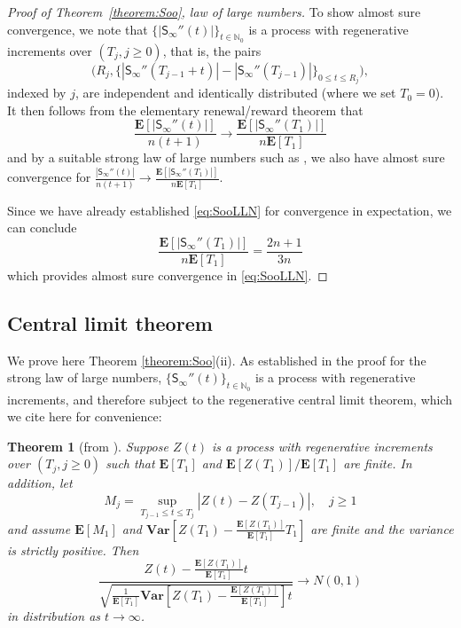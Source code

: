 \documentclass[a4paper,11pt,reqno]{amsart}
\newcommand{\paul}[1]{\todo[color=yellow!70,inline]{Paul: #1}}
\newcommand{\fabian}[1]{\todo[color=red!50,inline]{Fabian: #1}}
\newcommand{\IN}{\mathbb{N}}
\newcommand{\bE}{\mathbf{E}}
\newcommand{\bVar}{\mathbf{Var}}
\newcommand{\Soo}{\mathsf{S}_\infty}
\newtheorem{theorem}[lemma]{Theorem}
\theoremstyle{definition}
\begin{document}
\begin{proof}[Proof of Theorem~\ref{theorem:Soo}, law of large numbers]
 To show almost sure convergence, we note that $\{|\Soo''(t)|\}_{t\in\IN_0}$ is a process with regenerative increments over $(T_j, j \geq 0)$, that is, the pairs 
 \[
  \big(R_j, \{ |\Soo''(T_{j-1}+t)|-|\Soo''(T_{j-1})| \}_{0\leq t\leq R_j} \big),
 \]
indexed by $j$, are independent and identically distributed (where we set $T_0=0$). 
 It then follows from the elementary renewal/reward theorem that
 \[
  \frac{\bE[|\Soo''(t)|]}{n(t+1)} \to \frac{\bE[|\Soo''(T_1)|]}{n\bE[T_1]}
 \]
 and by a suitable strong law of large numbers such as \cite[Theorem~2.54]{Serfozo09}, we also have almost sure convergence for $\frac{|\Soo''(t)|}{n(t+1)} \to \frac{\bE[|\Soo''(T_1)|]}{n\bE[T_1]}$.
 
 Since we have already established \eqref{eq:SooLLN} for convergence in expectation, we can conclude 
 \begin{equation}\label{eq:quotexpect}
  \frac{\bE[|\Soo''(T_1)|]}{n\bE[T_1]}=\frac{2n+1}{3n}
 \end{equation}
 which provides almost sure convergence in \eqref{eq:SooLLN}. 
\end{proof}


\subsection*{Central limit theorem}
We prove here Theorem \ref{theorem:Soo}(ii).
As established in the proof for the strong law of large numbers, $\{\Soo''(t)\}_{t\in\IN_0}$ is a process with regenerative increments, and therefore subject to the regenerative central limit theorem, which we cite here for convenience: 

\begin{theorem}[from {\cite[Theorem~2.65]{Serfozo09}}]\label{theorem:regCLT}
 Suppose $Z(t)$ is a process with regenerative increments over $(T_j, j \geq 0)$ such that $\bE[T_1]$ and $\bE[Z(T_1)]/\bE[T_1]$ are finite. In addition, let 
 \[
  M_j=\sup_{T_{j-1}\leq t\leq T_j} |Z(t)-Z(T_{j-1})|, \quad j\geq 1
 \]
 and assume $\bE[M_1]$ and $\bVar\left[Z(T_1)-\frac{\bE[Z(T_1)]}{\bE[T_1]}T_1\right]$ are finite and the variance is strictly positive. Then
 \begin{equation}\label{eq:regCLT}
  \frac{Z(t)-\frac{\bE[Z(T_1)]}{\bE[T_1]}t}{\sqrt{\frac{1}{\bE[T_1]}\bVar\left[Z(T_1)-\frac{\bE[Z(T_1)]}{\bE[T_1]}\right]t}} \to N(0,1)
 \end{equation}
 in distribution as $t\to\infty$.
\end{theorem}
\end{document}
